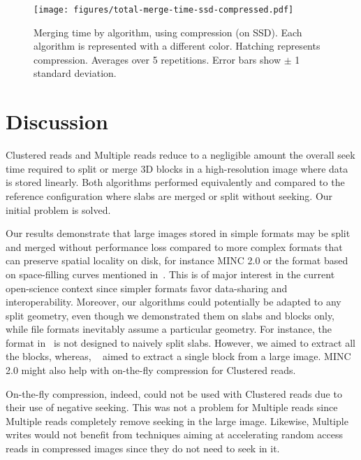 \documentclass[10pt, conference, compsocconf]{IEEEtran}
\begin{document}
\begin{figure}[h]
  \centering
  \texttt{[image: figures/total-merge-time-ssd-compressed.pdf]}
  \hfill
  \caption{Merging time by algorithm, using compression (on SSD). Each
    algorithm is represented with a different color. Hatching
    represents compression. Averages over 5 repetitions. Error bars
    show $\pm$ 1 standard deviation. }
\label{fig:compression}
\end{figure}

\section{Discussion}
\label{sec:discussion}

Clustered reads and Multiple reads reduce to a negligible
amount the overall seek time required to split or merge 3D blocks in a
high-resolution image where data is stored linearly. Both algorithms
performed equivalently and compared to the reference
configuration where slabs are merged or split without seeking. Our
initial problem is solved.



Our results demonstrate that large images stored in simple 
formats may be split and merged without performance loss compared to
more complex formats that can preserve spatial locality on disk,
for instance MINC 2.0 or the format based on space-filling curves
mentioned in~\cite{burns2013open}. This is of major interest in the
current open-science context since simpler formats favor data-sharing
and interoperability.  Moreover, our algorithms could potentially be
adapted to any split geometry, even though we demonstrated them on
slabs and blocks only, while file formats inevitably assume a
particular geometry. For instance, the format in~\cite{burns2013open}
is not designed to naively split slabs. However, we aimed to extract
all the blocks, whereas, ~\cite{burns2013open} aimed to extract a
single block from a large image. MINC 2.0 might also help with
on-the-fly compression for Clustered reads.

On-the-fly compression, indeed, could not be used with Clustered reads
due to their use of negative seeking. This was not a problem for
Multiple reads since Multiple reads completely remove seeking in the
large image. Likewise, Multiple writes would not benefit from
techniques aiming at accelerating random access reads in compressed
images since they do not need to seek in it. 
\end{document}
